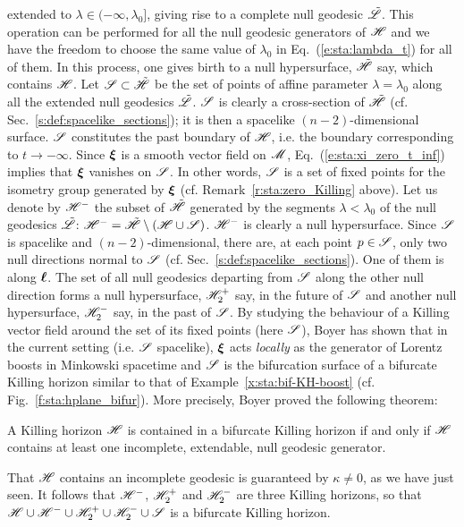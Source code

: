 extended to $\lambda\in(-\infty,\lambda_0]$, giving rise to a complete
null geodesic $\tilde{\mathscr{L}}$. This operation can be performed for all the
null geodesic generators of $\mathscr{H}$ and we have the freedom to choose the same value
of $\lambda_0$ in Eq.~(\ref{e:sta:lambda_t}) for all of them. In this process,
one gives birth to a null hypersurface, $\tilde{\mathscr{H}}$ say, which contains $\mathscr{H}$. Let $\mathscr{S}\subset\tilde{\mathscr{H}}$ be the set of points of
affine parameter $\lambda=\lambda_0$ along all the extended null geodesics
$\tilde{\mathscr{L}}$. $\mathscr{S}$ is clearly a cross-section of $\tilde{\mathscr{H}}$
(cf. Sec.~\ref{s:def:spacelike_sections}); it is then a
spacelike $(n-2)$-dimensional surface.
$\mathscr{S}$ constitutes the past boundary of $\mathscr{H}$, i.e. the boundary corresponding to $t\rightarrow -\infty$.
Since $\bm{\xi}$ is a smooth vector field on $\mathscr{M}$, Eq.~(\ref{e:sta:xi_zero_t_inf})
implies that $\bm{\xi}$ vanishes on $\mathscr{S}$.
In other words, $\mathscr{S}$ is a set of fixed points for the isometry group generated
by $\bm{\xi}$ (cf. Remark~\ref{r:sta:zero_Killing} above).
Let us denote by $\mathscr{H}^-$ the subset of $\tilde{\mathscr{H}}$
generated by the segments $\lambda<\lambda_0$ of the null geodesics $\tilde{\mathscr{L}}$:
$\mathscr{H}^- = \tilde{\mathscr{H}}\setminus(\mathscr{H}\cup\mathscr{S})$.
$\mathscr{H}^-$ is clearly a null hypersurface.
Since $\mathscr{S}$ is spacelike and $(n-2)$-dimensional, there are, at each point
$p\in\mathscr{S}$, only two null directions normal to $\mathscr{S}$ (cf. Sec.~\ref{s:def:spacelike_sections}). One of them is along $\bm{\ell}$. The set of all null geodesics
departing from $\mathscr{S}$ along the other null direction forms a null hypersurface,
$\mathscr{H}_2^+$ say, in the future of $\mathscr{S}$ and another null hypersurface, $\mathscr{H}_2^-$
say, in the past of $\mathscr{S}$.
By studying the behaviour of a Killing vector field around the set of its
fixed points (here $\mathscr{S}$), Boyer \cite{Boyer69} has shown that in
the current setting (i.e. $\mathscr{S}$ spacelike), $\bm{\xi}$ acts \emph{locally}
as the generator of Lorentz boosts in Minkowski spacetime and $\mathscr{S}$ is the bifurcation surface
of a bifurcate Killing horizon similar to that of Example~\ref{x:sta:bif-KH-boost}
(cf. Fig.~\ref{f:sta:hplane_bifur}).
More precisely, Boyer proved the following theorem:

\begin{prop}
A Killing horizon $\mathscr{H}$ is contained in a bifurcate Killing horizon if and
only if $\mathscr{H}$ contains at least one incomplete, extendable, null geodesic
generator.
\end{prop}

That $\mathscr{H}$ contains an incomplete geodesic is guaranteed by
$\kappa\not=0$, as we have just seen.
It follows that $\mathscr{H}^-$, $\mathscr{H}_2^+$ and $\mathscr{H}_2^-$
are three Killing horizons, so that $\mathscr{H}\cup\mathscr{H}^-\cup\mathscr{H}_2^+\cup\mathscr{H}_2^-\cup\mathscr{S}$
is a bifurcate Killing horizon.

